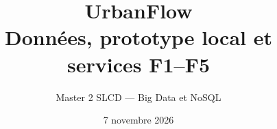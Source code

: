 \documentclass[10pt,a4paper]{article}
\title{\vspace{-1.2cm}UrbanFlow\\\large Données, prototype local et services F1--F5}
\author{Master 2 SLCD --- Big Data et NoSQL}
\date{7 novembre 2026}
\begin{document}
\maketitle\vspace{-1.0cm}






\label{fin-corps}
\clearpage\appendix


\end{document}
